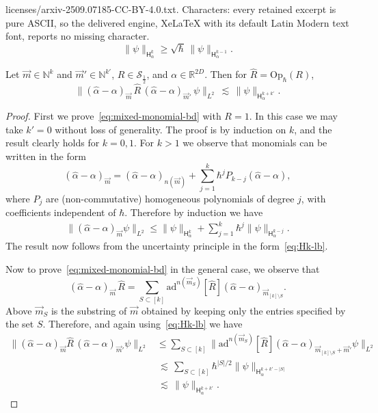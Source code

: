 \documentclass[10pt,a4paper]{amsart}
\def\Op{\mathrm{Op}}
\def\Real{{\mathbb R}}
\def\Sobolev{{\mathsf{H}}}
\def\ad{\mathrm{ad}}
\def\bbN{{\mathbb{N}}}
\def\lsim{{\,\lesssim\,}}
\newcommand{\mcal}[1]{{\mathcal{#1}}}
\begin{document}
licenses/arxiv-2509.07185-CC-BY-4.0.txt. Characters: every retained excerpt is pure ASCII, so the delivered engine, XeLaTeX with its default Latin Modern text font, reports no missing character.
\begin{equation}
\label{eq:Hk-lb}
\|\psi\|_{\Sobolev^k_\alpha} \geq \sqrt{\hbar}\, \|\psi\|_{\Sobolev^{k-1}_\alpha}.
\end{equation}

\begin{lemma}
\label{lemma:mixed-monomial-bd}
Let $\vec{m}\in\bbN^k$ and $\vec{m}'\in\bbN^{k'}$, $R\in\mcal{S}_{\frac12}$, and $\alpha\in\Real^{2D}$.  Then for
$\hat{R}=\Op_\hbar(R)$,
\begin{equation}
\label{eq:mixed-monomial-bd}
\|(\hat{\alpha}-\alpha)_{\vec{m}}\, \hat{R} \,(\hat{\alpha}-\alpha)_{\vec{m}'} \,\psi\|_{L^2}
\lsim \|\psi\|_{\Sobolev^{k+k'}_\alpha}.
\end{equation}
\end{lemma}

\begin{proof}
First we prove~\eqref{eq:mixed-monomial-bd} with $R=1$.  In this case we may take $k'=0$ without loss of generality.  The proof
is by induction on $k$, and the result clearly holds for $k=0,1$.  For $k>1$ we observe that monomials can be written in the form
\[
(\hat{\alpha}-\alpha)_{\vec{m}} = (\hat{\alpha}-\alpha)_{n(\vec{m})} + \sum_{j=1}^k\hbar^j P_{k-j}(\hat{\alpha}-\alpha),
\]
where $P_{j}$ are (non-commutative) homogeneous polynomials of degree $j$, with coefficients independent of $\hbar$.  Therefore by induction
we have
\begin{align*}
\|(\hat{\alpha}-\alpha)_{\vec{m}}\psi\|_{L^2}
\leq \|\psi\|_{\Sobolev^k_\alpha} + \sum_{j=1}^k \hbar^j \|\psi\|_{\Sobolev^{k-j}_\alpha}.
\end{align*}
The result now follows from the uncertainty principle in the form~\eqref{eq:Hk-lb}.

Now to prove~\eqref{eq:mixed-monomial-bd} in the general case, we observe that
\[
(\hat{\alpha}-\alpha)_{\vec{m}} \,\hat{R} = \sum_{S\subset[k]} \ad^{n(\vec{m}_S)}[\hat{R}] (\hat{\alpha}-\alpha)_{\vec{m}_{[k]\setminus S}}.
\]
Above $\vec{m}_S$ is the substring of $\vec{m}$ obtained by keeping only the entries specified by the set $S$.  Therefore,
and again using~\eqref{eq:Hk-lb} we have
\begin{align*}
\|(\hat{\alpha}-\alpha)_{\vec{m}} \hat{R}\,(\hat{\alpha}-\alpha)_{\vec{m}'}\psi\|_{L^2}
&\leq \sum_{S\subset[k]}
\|\ad^{n(\vec{m}_S)}[\hat{R}](\hat{\alpha}-\alpha)_{\vec{m}_{[k]\setminus S} + \vec{m}'}\psi\|_{L^2} \\
&\lsim \sum_{S\subset[k]} \hbar^{|S|/2} \|\psi\|_{\Sobolev^{k+k'-|S|}_\alpha} \\
&\lsim \|\psi\|_{\Sobolev^{k+k'}_\alpha}.
\end{align*}
\end{proof}
\end{document}
